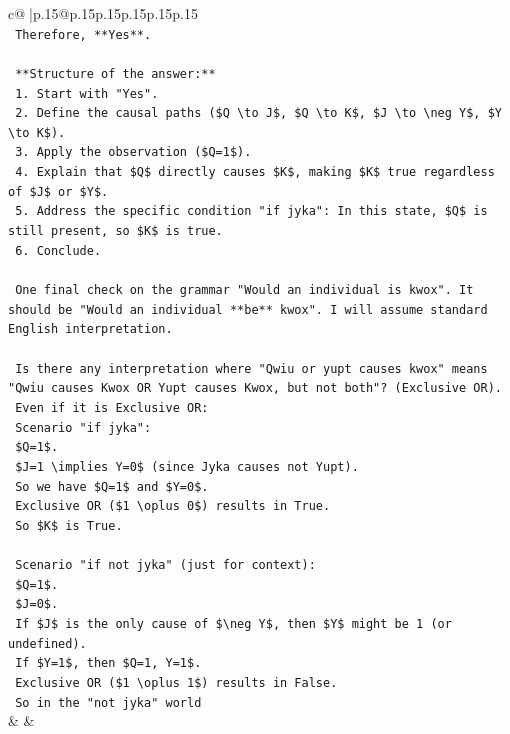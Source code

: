 \documentclass{article}
\begin{document}
{\begin{supertabular}{c@{$\;$}|p{.15\linewidth}@{}p{.15\linewidth}p{.15\linewidth}p{.15\linewidth}p{.15\linewidth}p{.15\linewidth}}
{{{\\ 
\texttt{    Therefore, **Yes**.} \\
\\ 
\texttt{    **Structure of the answer:**} \\
\texttt{    1.  Start with "Yes".} \\
\texttt{    2.  Define the causal paths (\$Q \textbackslash{}to J\$, \$Q \textbackslash{}to K\$, \$J \textbackslash{}to \textbackslash{}neg Y\$, \$Y \textbackslash{}to K\$).} \\
\texttt{    3.  Apply the observation (\$Q=1\$).} \\
\texttt{    4.  Explain that \$Q\$ directly causes \$K\$, making \$K\$ true regardless of \$J\$ or \$Y\$.} \\
\texttt{    5.  Address the specific condition "if jyka": In this state, \$Q\$ is still present, so \$K\$ is true.} \\
\texttt{    6.  Conclude.} \\
\\ 
\texttt{    One final check on the grammar "Would an individual is kwox". It should be "Would an individual **be** kwox". I will assume standard English interpretation.} \\
\\ 
\texttt{    Is there any interpretation where "Qwiu or yupt causes kwox" means "Qwiu causes Kwox OR Yupt causes Kwox, but not both"? (Exclusive OR).} \\
\texttt{    Even if it is Exclusive OR:} \\
\texttt{    Scenario "if jyka":} \\
\texttt{    \$Q=1\$.} \\
\texttt{    \$J=1 \textbackslash{}implies Y=0\$ (since Jyka causes not Yupt).} \\
\texttt{    So we have \$Q=1\$ and \$Y=0\$.} \\
\texttt{    Exclusive OR (\$1 \textbackslash{}oplus 0\$) results in True.} \\
\texttt{    So \$K\$ is True.} \\
\\ 
\texttt{    Scenario "if not jyka" (just for context):} \\
\texttt{    \$Q=1\$.} \\
\texttt{    \$J=0\$.} \\
\texttt{    If \$J\$ is the only cause of \$\textbackslash{}neg Y\$, then \$Y\$ might be 1 (or undefined).} \\
\texttt{    If \$Y=1\$, then \$Q=1, Y=1\$.} \\
\texttt{    Exclusive OR (\$1 \textbackslash{}oplus 1\$) results in False.} \\
\texttt{    So in the "not jyka" world} \\
            }
        }
    }
    & & \\ \\


\end{supertabular}}
\end{document}

